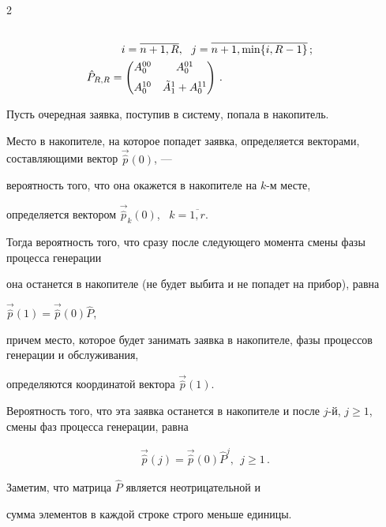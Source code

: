 \begin{multicols}{2}
\begin{align*}
\\


&\ \ \ i=\overline{n+1,R}, \ \ j=\overline{n+1,\min\{i,R-1\}}\,;


\\


\hat P_{R,R}&=


\begin{pmatrix}


A^{00}_{0} & A^{01}_{0}\\[6pt]


A^{10}_{0} & \Tilde A^{1}_{1}+A^{11}_{0}\\


\end{pmatrix}\,.


\end{align*}





Пусть очередная заявка, поступив в систему, попала в накопитель.


Место в накопителе, на которое попадет заявка, определяется векторами, составляющими вектор $\vec{\hat p}(0)$, ---


вероятность того, что она окажется в накопителе на $k$-м месте,


определяется вектором $\vec{\hat p}_{k}(0)$, \ $k=\overline{1,r}$.


Тогда вероятность того, что сразу после следующего момента смены фазы процесса генерации


она останется в накопителе (не будет выбита и не попадет на прибор), равна


$\vec{\hat p}(1)=\vec{\hat p}(0)\hat P$,


причем место, которое будет занимать заявка в накопителе, фазы процессов генерации и обслуживания,


определяются координатой вектора $\vec{\hat p}(1)$.


Вероятность того, что эта заявка останется в накопителе и после $j$-й, $j\ge 1$, смены фаз процесса генерации, равна


\begin{gather*}


\vec{\hat p}(j)=\vec{\hat p}(0)\hat P^j, \ \ j\ge 1\,.


\end{gather*}


Заметим, что матрица $\hat P$ является неотрицательной и


сумма элементов в каждой строке строго меньше единицы.



\end{multicols}

